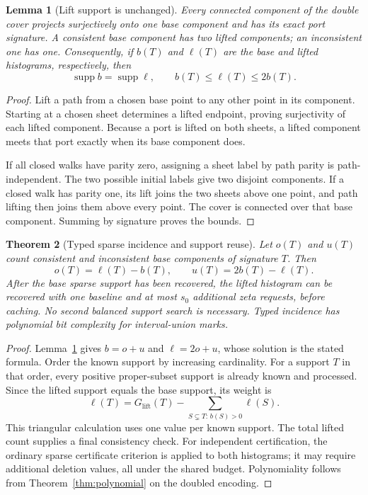 \documentclass[11pt,letterpaper]{article}
\newtheorem{theorem}{Theorem}[section]
\newtheorem{lemma}[theorem]{Lemma}
\newcommand{\supp}{\operatorname{supp}}
\begin{document}
\begin{lemma}[Lift support is unchanged]
\label{lem:lift}
Every connected component of the double cover projects surjectively onto one
base component and has its exact port signature. A consistent base component
has two lifted components; an inconsistent one has one. Consequently, if $b(T)$
and $\ell(T)$ are the base and lifted histograms, respectively, then
\[
 \supp b=\supp\ell,\qquad
 b(T)\leq\ell(T)\leq2b(T).
\]
\end{lemma}
\begin{proof}
Lift a path from a chosen base point to any other point in its component.
Starting at a chosen sheet determines a lifted endpoint, proving surjectivity
of each lifted component. Because a port is lifted on both sheets, a lifted
component meets that port exactly when its base component does.

If all closed walks have parity zero, assigning a sheet label by path parity
is path-independent. The two possible initial labels give two disjoint
components. If a closed walk has parity one, its lift joins the two sheets
above one point, and path lifting then joins them above every point. The cover
is connected over that base component. Summing by signature proves the bounds.
\end{proof}

\begin{theorem}[Typed sparse incidence and support reuse]
\label{thm:typed}
Let $o(T)$ and $u(T)$ count consistent and inconsistent base components of
signature $T$. Then
\[
 o(T)=\ell(T)-b(T),\qquad u(T)=2b(T)-\ell(T).
\]
After the base sparse support has been recovered, the lifted histogram can be
recovered with one baseline and at most $s_0$ additional zeta requests, before
caching. No second balanced support search is necessary. Typed incidence has
polynomial bit complexity for interval-union marks.
\end{theorem}
\begin{proof}
Lemma~\ref{lem:lift} gives $b=o+u$ and $\ell=2o+u$, whose solution is the stated
formula. Order the known support by increasing cardinality. For a support $T$
in that order, every positive proper-subset support is already known and
processed. Since the lifted support equals the base support, its weight is
\[
 \ell(T)=G_{\mathrm{lift}}(T)-
   \sum_{S\subsetneq T:\,b(S)>0}\ell(S).
\]
This triangular calculation uses one value per known support. The total lifted
count supplies a final consistency check. For independent certification, the
ordinary sparse certificate criterion is applied to both histograms; it may
require additional deletion values, all under the shared budget. Polynomiality
follows from Theorem~\ref{thm:polynomial} on the doubled encoding.
\end{proof}
\end{document}
